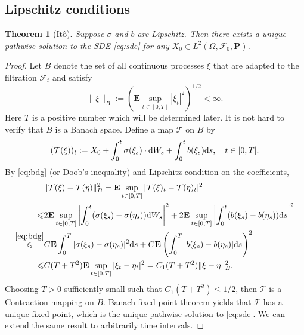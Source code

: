 \documentclass[twoside, 12pt]{book}
\numberwithin{equation}{chapter}
\newtheorem{theorem}{Theorem}[section]
\def\cF{{\mathcal F}}
\def\cT{{\mathcal T}}
\def\bE{{\mathbf E}}
\def\bP{{\mathbf P}}
\def\l{\left}
\def\r{\right}
\def\leq{\leqslant}
\def\d{\text{\rm{d}}}
\begin{document}
	\subsection{Lipschitz conditions}
	\begin{theorem}[It\^o]\label{thm:Ito}
		Suppose $\sigma$ and $b$ are Lipschitz. Then there exists a unique pathwise solution to the SDE \eqref{eq:sde} for any $X_0\in L^2(\Omega, \cF_0, \bP)$.
	\end{theorem}
	\begin{proof}
		Let $B$ denote the set of all continuous processes $\xi$ that are adapted to the filtration $\mathcal{F}_t$ and satisfy
		$$
		\|\xi\|_B:= \l(\bE \sup_{t\in [0,T]} |\xi_t|^2\r)^{1/2}<\infty. 
		$$
		Here $T$ is a positive number which will be determined later. It is not hard to verify that $B$ is a Banach space. Define a map $\cT$ on $B$ by 
		\begin{align*}
			(\cT(\xi))_t:= X_0+ \int_0^t \sigma(\xi_s) \cdot \d W_s+\int_0^t b(\xi_s) \d s, \quad t\in [0,T]. 
		\end{align*}
		By \eqref{eq:bdg} (or Doob's inequality) and Lipschitz condition on the coefficients, 
		\begin{equation*}
			\begin{aligned}
				&\|\cT(\xi)-\cT(\eta)\|_B^2= \bE \sup_{t\in [0,T]}|\cT(\xi)_{t}-\cT(\eta)_{t}|^2\\
				\leq & 2 \bE \sup_{t\in [0,T]} \l| \int_0^t (\sigma(\xi_s) -\sigma(\eta_s)) \d W_s\r|^2+ 2 \bE \sup_{t\in [0,T]} \l|\int_0^t (b(\xi_s) -b(\eta_s)) \d s\r|^2\\
				\overset{\eqref{eq:bdg}}{\leq} & C \bE \int_0^T |\sigma(\xi_s)-\sigma(\eta_s)|^2 \d s + C \bE \l( \int_0^T |b(\xi_s)-b(\eta_s)| \d s \r)^2 \\
				\leq & C (T+T^2) \bE \sup_{t\in [0,T]}|\xi_{t}-\eta_{t}|^2=C_1(T+T^2) \|\xi-\eta\|_B^2.
			\end{aligned}
		\end{equation*}
		Choosing $T>0$ sufficiently small such that $C_1 (T+T^2)\leq 1/2$, then $\cT$ is a Contraction mapping on $B$. Banach fixed-point theorem yields that $\cT$ has a unique fixed point, which is the unique pathwise solution to \eqref{eq:sde}. We can extend the same result to arbitrarily time intervals. 
	\end{proof}
	
\end{document}
